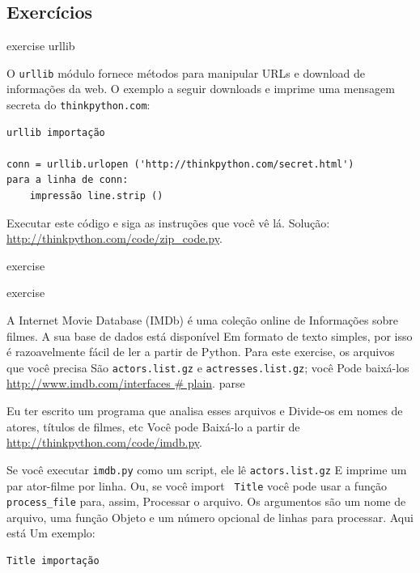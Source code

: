 \documentclass[10pt]{book}
\begin{document}
\begin{exercise}
\begin{v erbatim}


\section{Exercícios}

\begin{} exercise
\label{} urllib

O {\tt urllib} módulo fornece métodos para manipular URLs
e download de informações da web. O exemplo a seguir
downloads e imprime uma mensagem secreta do {\tt thinkpython.com}:

\begin{verbatim}
urllib importação

conn = urllib.urlopen ('http://thinkpython.com/secret.html')
para a linha de conn:
    impressão line.strip ()
\end{verbatim}

Executar este código e siga as instruções que você vê lá.
Solução: \url{http://thinkpython.com/code/zip_code.py}.

\end{} exercise


\begin{} exercise

A Internet Movie Database (IMDb) é uma coleção online de
Informações sobre filmes. A sua base de dados está disponível
Em formato de texto simples, por isso é razoavelmente fácil de ler a partir de
Python. Para este exercise, os arquivos que você precisa
São {\tt actors.list.gz} e {\tt actresses.list.gz}; você
Pode baixá-los \url{http://www.imdb.com/interfaces # plain}.
\index{} parse

Eu ter escrito um programa que analisa esses arquivos e
Divide-os em nomes de atores, títulos de filmes, etc Você pode
Baixá-lo a partir de \url{http://thinkpython.com/code/imdb.py}.

Se você executar {\tt imdb.py} como um script, ele lê {\tt actors.list.gz}
E imprime um par ator-filme por linha. Ou, se você {import \tt
Title} você pode usar a função \verb "process_file" para, assim,
Processar o arquivo. Os argumentos são um nome de arquivo, uma função
Objeto e um número opcional de linhas para processar. Aqui está
Um exemplo:
%
\begin{verbatim}
Title importação


\end{verbatim}
\end{}
\end{v erbatim}
\end{exercise}
\end{document}
